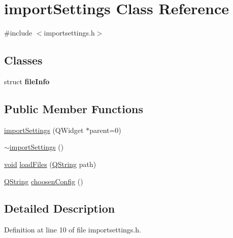 \hypertarget{classimport_settings}{\section{import\-Settings \-Class \-Reference}
\label{classimport_settings}
}


{\ttfamily \#include $<$importsettings.\-h$>$}

\subsection*{\-Classes}
\begin{DoxyCompactItemize}
\item 
struct {\bfseries file\-Info}
\end{DoxyCompactItemize}
\subsection*{\-Public \-Member \-Functions}
\begin{DoxyCompactItemize}
\item 
\hyperlink{classimport_settings_acb2ef6bf76c3fc81b764a2cfac5b2582}{import\-Settings} (\-Q\-Widget $\ast$parent=0)
\item 
\hyperlink{classimport_settings_a48406c5f6bb7dfa94e120ea8f3bb72a6}{$\sim$import\-Settings} ()
\item 
\hyperlink{group___u_a_v_objects_plugin_ga444cf2ff3f0ecbe028adce838d373f5c}{void} \hyperlink{classimport_settings_a133358bf471790d7031c111bf5f0dfb1}{load\-Files} (\hyperlink{group___u_a_v_objects_plugin_gab9d252f49c333c94a72f97ce3105a32d}{\-Q\-String} path)
\item 
\hyperlink{group___u_a_v_objects_plugin_gab9d252f49c333c94a72f97ce3105a32d}{\-Q\-String} \hyperlink{classimport_settings_a16a67f71fc0787a882d94dd33b3ce38b}{choosen\-Config} ()
\end{DoxyCompactItemize}


\subsection{\-Detailed \-Description}


\-Definition at line 10 of file importsettings.\-h.



